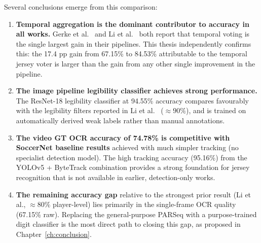 Several conclusions emerge from this comparison:

\begin{enumerate}
    \item \textbf{Temporal aggregation is the dominant contributor
    to accuracy in all works.} Gerke et al.\ \cite{gerke2015soccer} and
    Li et al.\ \cite{li2018jersey} both report that temporal voting is
    the single largest gain in their pipelines. This thesis independently
    confirms this: the 17.4 pp gain from 67.15\% to 84.53\% attributable
    to the temporal jersey voter is larger than the gain from any other
    single improvement in the pipeline.

    \item \textbf{The image pipeline legibility classifier achieves
    strong performance.} The ResNet-18 legibility classifier at 94.55\%
    accuracy compares favourably with the legibility filters reported
    in Li et al.\ \cite{li2018jersey} (${\approx}90\%$), and is trained
    on automatically derived weak labels rather than manual annotations.

    \item \textbf{The video GT OCR accuracy of 74.78\% is competitive
    with SoccerNet baseline results} \cite{deliege2021soccernet} achieved
    with much simpler tracking (no specialist detection
    model). The high tracking accuracy (95.16\%) from the YOLOv5 +
    ByteTrack combination provides a strong foundation for jersey
    recognition that is not available in earlier, detection-only works.

    \item \textbf{The remaining accuracy gap} relative to the strongest
    prior result (Li et al., ${\approx}80\%$ player-level) lies primarily
    in the single-frame OCR quality (67.15\% raw). Replacing the
    general-purpose PARSeq with a purpose-trained digit classifier
    is the most direct path to closing this gap, as proposed in
    Chapter~\ref{ch:conclusion}.
\end{enumerate}
